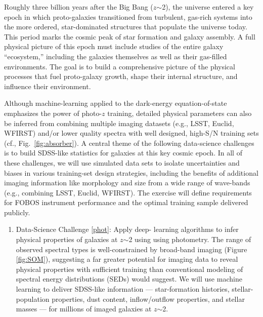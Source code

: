\documentclass[oneside,11pt]{amsart}
\newcounter{chalno}
\newcommand{\chal}[1]{\refstepcounter{chalno}\label{#1}}
\begin{document}
Roughly three billion years after the Big Bang ($z$$\sim$2), the
universe entered a key epoch in which proto-galaxies transitioned from
turbulent, gas-rich systems into the more ordered, star-dominated
structures that populate the universe today.  This period marks the
cosmic peak of star formation and galaxy assembly.   A full physical
picture of this epoch must include studies of the entire galaxy
``ecosystem,'' including the galaxies themselves as well as their
gas-filled environments.  The goal is to build a comprehensive picture
of the physical processes that fuel proto-galaxy growth, shape their
internal structure, and influence their environment.

Although machine-learning applied to the dark-energy equation-of-state
emphasizes the power of photo-$z$ training, detailed physical parameters
can also be inferred from combining multiple imaging datasets (e.g.,
LSST, Euclid, WFIRST) and/or lower quality spectra with well designed,
high-S/N training sets (cf., Fig.~\ref{fig:absorber}).  A central theme
of the following data-science challenges is to build SDSS-like
statistics for galaxies at this key cosmic epoch.  In all of these
challenges, we will use simulated data sets to isolate uncertainties and
biases in various training-set design strategies, including the benefits
of additional imaging information like morphology and size from a wide
range of wave-bands (e.g., combining LSST, Euclid, WFIRST).  The
exercise will define requirements for FOBOS instrument performance and
the optimal training sample delivered publicly.


\begin{enumerate}[rightmargin=0.2cm,leftmargin=0.2cm]
%
\chal{phot}
%
\item[] {\textsf {\large Data-Science Challenge \ref{phot}: Apply deep-
learning algorithms to infer physical properties of galaxies at
$z$$\sim$2 using using photometry.}} The range of observed spectral
types is well-constrained by broad-band imaging (Figure \ref{fig:SOM}),
suggesting a far greater potential for imaging data to reveal physical
properties with sufficient training than conventional modeling of
spectral energy distributions (SEDs) would suggest.  We will use machine
learning to deliver SDSS-like information --- star-formation histories,
stellar-population properties, dust content, inflow/outflow properties,
and stellar masses --- for millions of imaged galaxies at $z$$\sim$2.
%
\end{enumerate}
\end{document}
